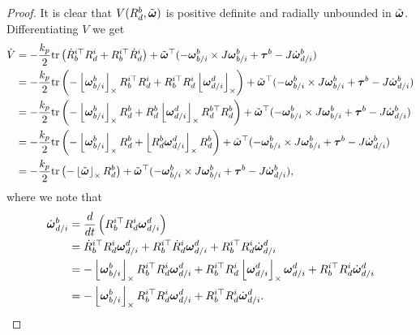 \begin{proof}
It is clear that $V(R_d^b,\tilde{\omegabf})$ is positive definite and radially unbounded in $\tilde{\omegabf}$.
Differentiating $V$ we get
\begin{align*}
\dot{V} &= -\frac{k_p}{2} \trace{\dot{R}_b^{i\top} R_d^i + R_b^{i\top} \dot{R}_d^i}+ \tilde{\omegabf}^\top ( -\omegabf_{b/i}^b \times J\omegabf_{b/i}^b + \taubf^b - J\dot{\omegabf}_{d/i}^b) \\
        &= -\frac{k_p}{2} \trace{-\ss{\omegabf_{b/i}^b} R_b^{i\top} R_d^i + R_b^{i\top} R_d^i\ss{\omegabf_{d/i}^d} } + \tilde{\omegabf}^\top ( -\omegabf_{b/i}^b \times J\omegabf_{b/i}^b + \taubf^b - J\dot{\omegabf}_{d/i}^b) \\
        &= -\frac{k_p}{2} \trace{-\ss{\omegabf_{b/i}^b} R_d^b + R_d^b \ss{\omegabf_{d/i}^d}R_d^{b\top} R_d^b } + \tilde{\omegabf}^\top ( -\omegabf_{b/i}^b \times J\omegabf_{b/i}^b + \taubf^b - J\dot{\omegabf}_{d/i}^b) \\
        &= -\frac{k_p}{2} \trace{-\ss{\omegabf_{b/i}^b} R_d^b + \ss{R_d^b \omegabf_{d/i}^d} R_d^b } + \tilde{\omegabf}^\top ( -\omegabf_{b/i}^b \times J\omegabf_{b/i}^b + \taubf^b - J\dot{\omegabf}_{d/i}^b) \\
        &= -\frac{k_p}{2} \trace{-\ss{\tilde{\omegabf}} R_d^b } + \tilde{\omegabf}^\top ( -\omegabf_{b/i}^b \times J\omegabf_{b/i}^b + \taubf^b - J\dot{\omegabf}_{d/i}^b),
\end{align*}
where we note that 
\begin{align*}
\dot{\omegabf}_{d/i}^b &= \frac{d}{dt}\left(R_b^{i\top}R_d^i\omegabf_{d/i}^d\right) \\
	&=	\dot{R}_b^{i\top}R_d^i\omegabf_{d/i}^d + R_b^{i\top}\dot{R}_d^i\omegabf_{d/i}^d + R_b^{i\top}R_d^i\dot{\omegabf}_{d/i}^d \\
	&=	-\ss{\omegabf_{b/i}^b} R_b^{i\top} R_d^i\omegabf_{d/i}^d + R_b^{i\top}R_d^i\ss{\omegabf_{d/i}^d}\omegabf_{d/i}^d + R_b^{i\top}R_d^i\dot{\omegabf}_{d/i}^d \\
	&= -\ss{\omegabf_{b/i}^b} R_b^{i\top} R_d^i\omegabf_{d/i}^d  + R_b^{i\top}R_d^i\dot{\omegabf}_{d/i}^d. 
\end{align*}


\end{proof}
